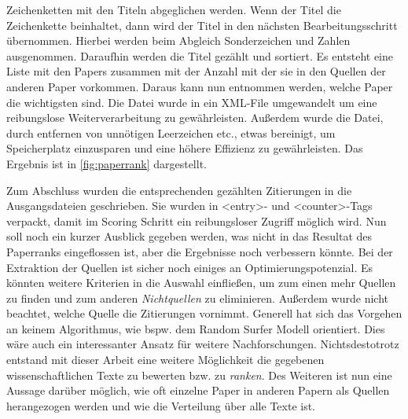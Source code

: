Zeichenketten mit den Titeln abgeglichen werden. Wenn der Titel die
Zeichenkette beinhaltet, dann wird der Titel in den nächsten
Bearbeitungsschritt übernommen. Hierbei werden beim Abgleich
Sonderzeichen und Zahlen ausgenommen.  Daraufhin
werden die Titel gezählt und sortiert. Es entsteht eine Liste mit den
Papers zusammen mit der Anzahl mit der sie in den Quellen der anderen
Paper vorkommen. Daraus kann nun entnommen werden, welche Paper die
wichtigsten sind. Die Datei wurde in ein XML-File umgewandelt um eine
reibungslose Weiterverarbeitung zu gewährleisten. Außerdem wurde die
Datei, durch entfernen von unnötigen Leerzeichen etc., etwas
bereinigt, um Speicherplatz einzusparen und eine höhere Effizienz zu
gewährleisten. Das Ergebnis ist in \autoref{fig:paperrank}
dargestellt.



Zum Abschluss wurden die entsprechenden gezählten Zitierungen in die
Ausgangsdateien geschrieben. Sie wurden in <entry>- und <counter>-Tags
verpackt, damit im Scoring Schritt ein reibungsloser Zugriff möglich
wird.  Nun soll noch ein kurzer Ausblick gegeben werden, was nicht in
das Resultat des Paperranks eingeflossen ist, aber die Ergebnisse noch
verbessern könnte. Bei der Extraktion der Quellen ist sicher noch
einiges an Optimierungspotenzial. Es könnten weitere Kriterien in die
Auswahl einfließen, um zum einen mehr Quellen zu finden und zum
anderen \emph{Nichtquellen} zu eliminieren. Außerdem wurde nicht
beachtet, welche Quelle die Zitierungen vornimmt. Generell hat sich
das Vorgehen an keinem Algorithmus, wie bspw. dem Random Surfer Modell
orientiert. Dies wäre auch ein interessanter Ansatz für weitere
Nachforschungen.  Nichtsdestotrotz entstand mit dieser Arbeit eine
weitere Möglichkeit die gegebenen wissenschaftlichen Texte zu bewerten
bzw. zu \emph{ranken}. Des Weiteren ist nun eine Aussage darüber
möglich, wie oft einzelne Paper in anderen Papern als Quellen
herangezogen werden und wie die Verteilung über alle Texte ist.



